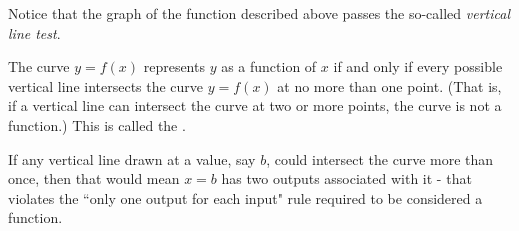 \documentclass{ximera}
\begin{document}
%


Notice that the graph of the function described above passes the so-called
\textit{vertical line test}.

\begin{theorem}
The curve $y=f(x)$ represents $y$ as a function of $x$ if and only if every possible vertical line intersects the curve $y=f(x)$ at
no more than one point. (That is, if a vertical line can intersect the curve at two or more points, the curve is not a function.) This is called the .
\end{theorem}

If any vertical line drawn at a value, say $b$, could intersect the curve more than once, then that would mean $x=b$ has two outputs associated with it - that violates the ``only one output for each input" rule required to be considered a function.
\end{document}
